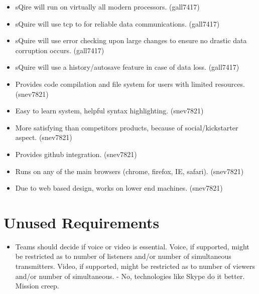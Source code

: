 \documentclass[11pt]{report}
\begin{document}
\begin{itemize}
            \item sQire will run on virtually all modern processors. (gall7417)
            \item sQuire will use tcp to for reliable data communications. (gall7417)
            \item sQuire will use error checking upon large changes to ensure no drastic data corruption occurs. (gall7417)
            \item sQuire will use a history/autosave feature in case of data loss. (gall7417)
            \item Provides code compilation and file system for users with limited resources. (snev7821)
            \item Easy to learn system, helpful syntax highlighting. (snev7821)
            \item More satisfying than competitors products, because of social/kickstarter aspect. (snev7821)
            \item Provides github integration. (snev7821)
            \item Runs on any of the main browsers (chrome, firefox, IE, safari). (snev7821)
            \item Due to web based design, works on lower end machines. (snev7821)
    \end{itemize}

\section{Unused Requirements}
    \begin{itemize}
        \item Teams should decide if voice or video is essential. Voice, if supported, might be restricted as to number of listeners and/or number of simultaneous transmitters. Video, if supported, might be restricted as to number of viewers and/or number of simultaneous. - No, technologies like Skype do it better. Mission creep.
    \end{itemize}
    
\end{document}
